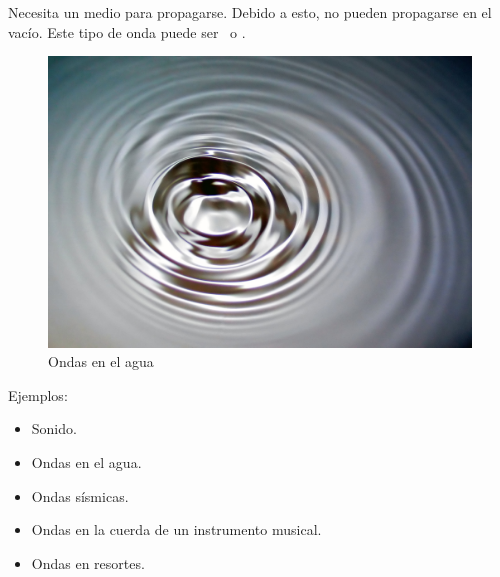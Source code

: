 Necesita un medio para propagarse. Debido a esto, no pueden propagarse en el vacío. Este tipo de onda puede ser \longitudinal\ o \transversal.

\begin{figure}[H]
  \centering
  \includegraphics[scale=0.2]{imagenes/ondas_agua.jpg}
  \caption{Ondas en el agua\cite{wikiwaves}}
\end{figure}

Ejemplos:

\begin{itemize}
  \item Sonido.
  \item Ondas en el agua.
  \item Ondas sísmicas.
  \item Ondas en la cuerda de un instrumento musical.
  \item Ondas en resortes.
\end{itemize}
